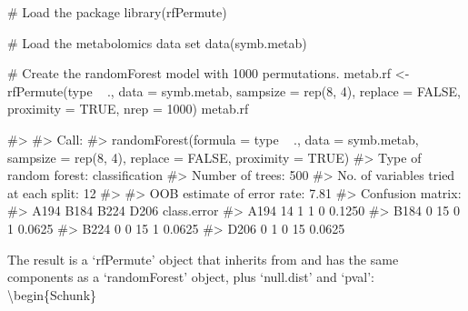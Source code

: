 \begin{Schunk}
\begin{Sinput}
# Load the package
library(rfPermute)
\end{Sinput}
\end{Schunk}\begin{Schunk}
\begin{Sinput}
# Load the metabolomics data set
data(symb.metab)

# Create the randomForest model with 1000 permutations. 
metab.rf <- rfPermute(type ~ ., data = symb.metab, sampsize = rep(8, 4), replace = FALSE, proximity = TRUE, nrep = 1000)
metab.rf
\end{Sinput}
\begin{Soutput}
#> 
#> Call:
#>  randomForest(formula = type ~ ., data = symb.metab, sampsize = rep(8,      4), replace = FALSE, proximity = TRUE) 
#>                Type of random forest: classification
#>                      Number of trees: 500
#> No. of variables tried at each split: 12
#> 
#>         OOB estimate of  error rate: 7.81%
#> Confusion matrix:
#>      A194 B184 B224 D206 class.error
#> A194   14    1    1    0      0.1250
#> B184    0   15    0    1      0.0625
#> B224    0    0   15    1      0.0625
#> D206    0    1    0   15      0.0625
\end{Soutput}
\end{Schunk}

The result is a `rfPermute' object that inherits from and has the same
components as a `randomForest' object, plus `null.dist' and `pval':
\textbackslash{}begin\{Schunk\}

